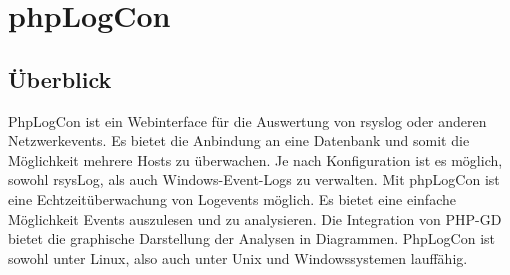 \section{phpLogCon}
\subsection{Überblick}
PhpLogCon ist ein Webinterface für die Auswertung von rsyslog oder anderen Netzwerkevents. Es bietet die Anbindung an eine Datenbank und somit die Möglichkeit mehrere Hosts zu überwachen. Je nach Konfiguration ist es möglich, sowohl rsysLog, als auch Windows-Event-Logs zu verwalten. Mit phpLogCon ist eine Echtzeitüberwachung von Logevents möglich. Es bietet eine einfache Möglichkeit Events auszulesen und zu analysieren. Die Integration von PHP-GD bietet die graphische Darstellung der Analysen in Diagrammen.
PhpLogCon ist sowohl unter Linux, also auch unter Unix und Windowssystemen lauffähig.